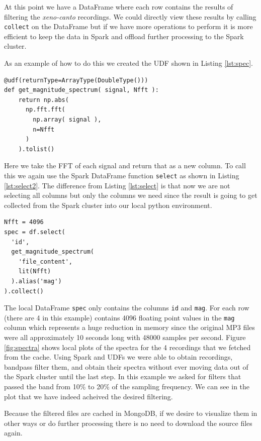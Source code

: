 \documentclass[conference,twoside]{IEEEtran}
\newcommand{\code}[1]{\texttt{#1}}
\begin{document}
At this point we have a DataFrame where each row contains the results of filtering the \textit{xeno-canto} recordings. We could directly view these results by calling \code{collect} on the DataFrame but if we have more operations to perform it is more efficient to keep the data in Spark and offload further processing to the Spark cluster.

As an example of how to do this we created the UDF shown in Listing \ref{lst:spec}.
\begin{lstlisting}[language=Txt, caption={Taking FFTs with Spark}, label={lst:spec}]
@udf(returnType=ArrayType(DoubleType()))
def get_magnitude_spectrum( signal, Nfft ):
    return np.abs(
      np.fft.fft(
        np.array( signal ),
        n=Nfft
      )
    ).tolist()
\end{lstlisting}
Here we take the FFT of each signal and return that as a new column. To call this we again use the Spark DataFrame function \code{select} as shown in Listing \ref{lst:select2}. The difference from Listing \ref{lst:select} is that now we are not selecting all columns but only the columns we need since the result is going to get collected from the Spark cluster into our local python environment.
\begin{lstlisting}[language=Txt, caption={Collecting UDF Results for Local Processing}, label={lst:select2}]
Nfft = 4096
spec = df.select(
  'id',
  get_magnitude_spectrum(
    'file_content',
    lit(Nfft)
  ).alias('mag')
).collect()
\end{lstlisting}
The local DataFrame \code{spec} only contains the columns \code{id} and \code{mag}. For each row (there are 4 in this example) contains 4096 floating point values in the \code{mag} column which represents a huge reduction in memory since the original MP3 files were all approximately 10 seconds long with 48000 samples per second. Figure \ref{fig:spectra} shows local plots of the spectra for the 4 recordings that we fetched from the cache. Using Spark and UDFs we were able to obtain recordings, bandpass filter them, and obtain their spectra without ever moving data out of the Spark cluster until the last step. In this example we asked for filters that passed the band from 10\% to 20\% of the sampling frequency. We can see in the plot that we have indeed acheived the desired filtering.

Because the filtered files are cached in MongoDB, if we desire to visualize them in other ways or do further processing there is no need to download the source files again.
\end{document}
